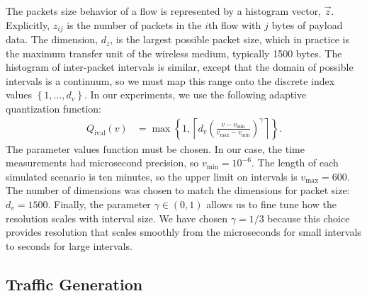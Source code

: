 \documentclass[conference]{IEEEtran}
\newcommand{\Qi}{Q_{\text{ival}}}
\newcommand{\set}[1]{\left\{#1\right\}}
\newcommand{\ceil}[1]{\left\lceil#1\right\rceil}
\newcommand{\fracx}[2]{#1/#2}
\newcommand{\fracp}[2]{\left(\frac{#1}{#2}\right)}
\begin{document}
The packets size behavior of a flow is represented by a histogram vector, $\vec{z}$. Explicitly,  $z_{ij}$ is the number of packets in the $i$th flow with $j$ bytes of payload data. The dimension, $d_z$, is the largest possible packet size, which in practice is the maximum transfer unit of the wireless medium, typically 1500 bytes. The histogram of inter-packet intervals is similar, except that the domain of possible intervals is a continuum, so we must map this range onto the discrete index values $\left\{1,\dots,d_v\right\}$. In our experiments, we use the following adaptive quantization function:
\begin{align}
\label{eqn:interval-quantization}
\Qi(v) &= \max\set{1,\ceil{d_v\fracp{v-v_{\min}}{v_{\max}-v_{\min}}^\gamma}}.
\end{align}
The parameter values function must be chosen. In our case, the time measurements had microsecond precision, so $v_{\min}=10^{-6}$. The length of each simulated scenario is ten minutes, so the upper limit on intervals is $v_{\max}=600$. The number of dimensions was chosen to match the dimensions for packet size: $d_v=1500$. Finally, the parameter $\gamma\in(0,1)$ allows us to fine tune how the resolution scales with interval size. We have chosen $\gamma=\fracx{1}{3}$ because this choice provides resolution that scales smoothly from the microseconds for small intervals to seconds for large intervals.

\subsection{Traffic Generation}
\end{document}
